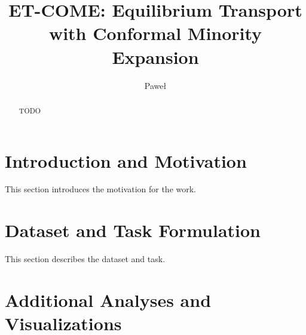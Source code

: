 \documentclass[cameraready]{Interspeech}
\title{ET-COME: Equilibrium Transport with Conformal Minority Expansion}
\author[affiliation={1}]{Paweł}{Pozorski}
\begin{document}
\maketitle

\begin{abstract}
TODO
\end{abstract}

\section{Introduction and Motivation}

This section introduces the motivation for the work.

\section{Dataset and Task Formulation}

This section describes the dataset and task.




\appendix
\section{Additional Analyses and Visualizations}
\label{app:extra_analysis}
\end{document}
